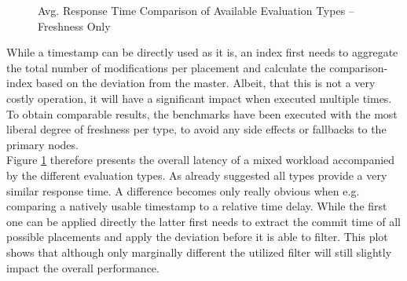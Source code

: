 \begin{figure}[t] 
    \centering 
    \caption{Avg. Response Time Comparison of Available Evaluation Types -- Freshness Only}
    \label{fig:eval_type}
\end{figure}

While a timestamp can be directly used as it is, an index first needs to aggregate the total number of modifications per placement and 
calculate the comparison-index based on the deviation from the master.
Albeit, that this is not a very costly operation, it will have a significant impact when executed multiple times.
To obtain comparable results, the benchmarks have been executed with the most liberal degree of freshness per type, to avoid any side effects or fallbacks to the primary nodes.\\
Figure \ref{fig:eval_type} therefore presents the overall latency of a mixed workload accompanied by the different evaluation types.
As already suggested all types provide a very similar response time. A difference becomes only really obvious when e.g. comparing a natively usable
timestamp to a relative time delay. While the first one can be applied directly the latter first
needs to extract the commit time of all possible placements and apply the deviation before it is able to filter.
This plot shows that although only marginally different the utilized filter will still slightly impact the overall performance.





